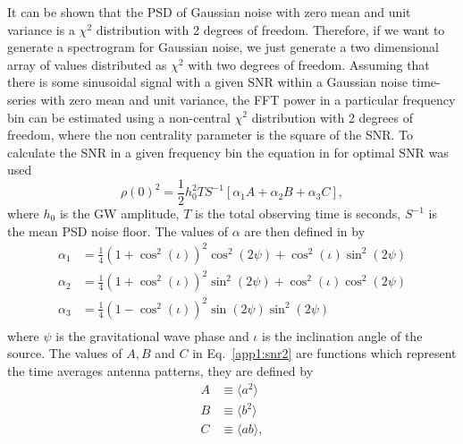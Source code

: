 It can be shown that the \gls{PSD} of Gaussian noise with zero mean and unit variance is a $\chi^2$ distribution with 2 degrees of freedom. Therefore, if we want to generate a spectrogram for Gaussian noise, we just generate a two dimensional array of values distributed as $\chi^2$ with two degrees of freedom.
Assuming that there is some sinusoidal signal with a given \gls{SNR} within a Gaussian noise time-series with zero mean and unit variance, the \gls{FFT} power in a particular frequency bin can be estimated using a non-central $\chi^2$ distribution with 2 degrees of freedom, where the non centrality parameter is the square of the \gls{SNR}. 
To calculate the \gls{SNR} in a given frequency bin the equation in \citep{prix2007SearchContinuous} for optimal \gls{SNR} was used
\begin{equation}
	\label{app1:snr2}
    \rho(0)^2 = \frac{1}{2}h_0^2 T S^{-1} \left[ \alpha_1 A + \alpha_2 B + \alpha_3 C \right],
\end{equation}
where $h_0$ is the \gls{GW} amplitude, $T$ is the total observing time is seconds, $S^{-1}$ is the mean \gls{PSD} noise floor. The values of $\alpha$ are then defined in \citep{prix2007SearchContinuous} by
\begin{equation}
\begin{split}
\alpha_1 &= \frac{1}{4}\left(1 + \cos^2 \left( \iota\right)  \right)^2 \cos^2\left( 2 \psi \right)  + \cos^2\left( \iota\right)  \sin^2 \left( 2\psi \right) \\
\alpha_2 &= \frac{1}{4}\left(1 + \cos^2 \left( \iota \right) \right)^2 \sin^2\left( 2 \psi \right)  + \cos^2\left( \iota\right)  \cos^2 \left( 2\psi \right) \\
\alpha_3 &= \frac{1}{4}\left(1 - \cos^2 \left( \iota\right)  \right)^2 \sin\left( 2 \psi \right) \sin^2 \left( 2\psi \right) \\
\end{split}
\end{equation}
where $\psi$ is the gravitational wave phase and $\iota$ is the inclination angle of the source.
The values of $A,B$ and $C$ in Eq.~\ref{app1:snr2} are functions which represent the time averages antenna patterns, they are defined by
\begin{equation}
\begin{split}
A &\equiv \langle a^2 \rangle \\
B &\equiv \langle b^2 \rangle \\
C &\equiv \langle ab \rangle, \\
\end{split}
\end{equation}
